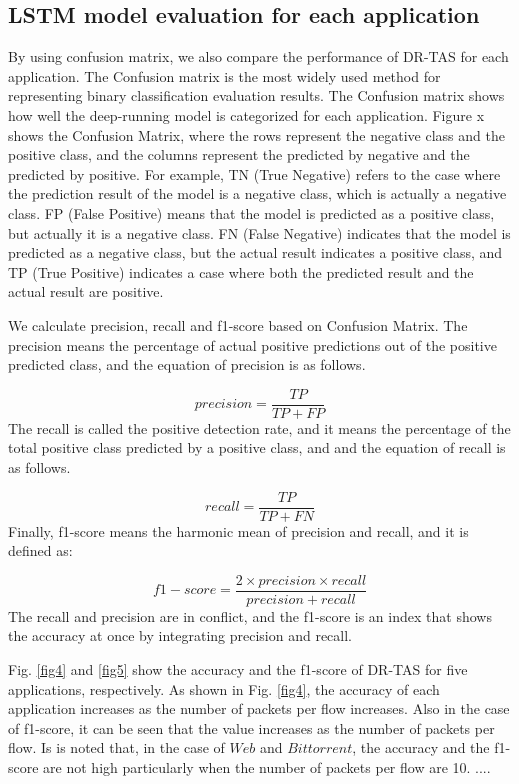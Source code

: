 \documentclass[10pt, twoside, jounal]{IEEEtran}
\begin{document}
\subsection{LSTM model evaluation for each application}
By using confusion matrix, we also compare the performance of DR-TAS for each application.
The Confusion matrix is ​​the most widely used method for representing binary classification evaluation results.
The Confusion matrix shows how well the deep-running model is categorized for each application.
Figure x shows the Confusion Matrix, where the rows represent the negative class and the positive class, and the columns represent the predicted by negative and the predicted by positive.
For example, TN (True Negative) refers to the case where the prediction result of the model is a negative class, which is actually a negative class.
FP (False Positive) means that the model is predicted as a positive class, but actually it is a negative class.
FN (False Negative) indicates that the model is predicted as a negative class, but the actual result indicates a positive class, and TP (True Positive) indicates a case where both the predicted result and the actual result are positive.

We calculate precision, recall and f1-score based on Confusion Matrix.
The precision means the percentage of actual positive predictions out of the positive predicted class, and the
equation of precision is as follows.

\begin{equation}
precision = \frac{TP}{TP + FP}
\end{equation}
The recall is called the positive detection rate, and it means the percentage of the total positive class predicted by a positive class, and and the equation of recall is as follows.

\begin{equation}
recall = \frac{TP}{TP + FN}
\end{equation}
Finally, f1-score means the harmonic mean of precision and recall, and it is defined as:

\begin{equation}
f1-score = \frac{2 \times precision \times recall}{precision + recall}
\end{equation}
The recall and precision are in conflict, and the f1-score is an index that shows the accuracy at once by integrating precision and recall.

Fig. \ref{fig4} and \ref{fig5} show the accuracy and the f1-score of DR-TAS for five applications, respectively.
As shown in Fig. \ref{fig4}, the accuracy of each application increases as the number of packets per flow increases.
Also in the case of f1-score, it can be seen that the value increases as the number of packets per flow.
Is is noted that, in the case of $Web$ and $Bittorrent$, the accuracy and the f1-score are not high particularly when
the
number of packets per flow are 10. ....
\end{document}
